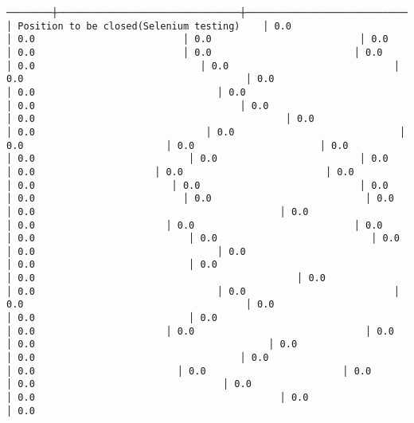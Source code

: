 \documentclass[11pt]{article}
\begin{document}
\begin{Verbatim}[commandchars=\\\{\}]
────────┼────────────────────────────────┼─────────────────────────────┼─────────────────────────┼──────────────────────────┼────────────────────────────────┼───────────────────────────────────────┼────────────────────────────────────────────────────────────┼───────────────────────────────────────────┼──────────────────────────────────────┼────────────────────────────────────┼─────────────────────────────────────────────────────┼───────────────────────────────────────────┼───────────────────────────────────────────┼────────────────────────────────────┼────────────────────────┼───────────────────────────────────────┼──────────────────────────────────────┼────────────────────────────────────┼────────────────────────────────────────┼────────────────────────────────┼──────────────────────────┼─────────────────────────────┤
│ Position to be closed(Selenium testing)    │ 0.0                                      │ 0.0                          │ 0.0                          │ 0.0                          │ 0.0                          │ 0.0                         │ 0.0                         │ 0.0                             │ 0.0                             │ 0.0                                       │ 0.0                                  │ 0.0                                │ 0.0                                         │ 0.0                                    │ 0.0                                    │ 0.0                                            │ 0.0                             │ 0.0                              │ 0.0                             │ 0.0                         │ 0.0                      │ 0.0                                │ 0.0                           │ 0.0                         │ 0.0                      │ 0.0                     │ 0.0                         │ 0.0                                  │ 0.0                        │ 0.0                            │ 0.0                           │ 0.0                          │ 0.0                           │ 0.0                                            │ 0.0                                           │ 0.0                      │ 0.0                       │ 0.0                            │ 0.0                                │ 0.0                           │ 0.0                           │ 0.0                          │ 0.0                                │ 0.0                            │ 0.0                           │ 0.0                                         │ 0.0                                              │ 0.0                           │ 0.0                                │ 0.0                          │ 0.0                                       │ 0.0                          │ 0.0                           │ 0.0                                     │ 0.0                       │ 0.0                              │ 0.0                                     │ 0.0                                         │ 0.0                                         │ 0.0                                    │ 0.0                                │ 0.0                         │ 0.0                        │ 0.0                              │ 0.0                                 │ 0.0                            │ 0.0                                           │ 0.0                            │ 0.0 
\end{Verbatim}
\end{document}
